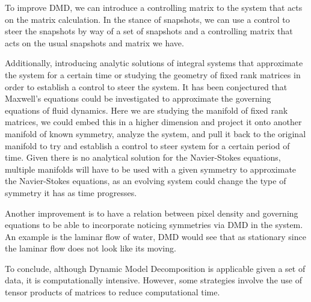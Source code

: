 \documentclass[12pt]{report}
\begin{document}
To improve DMD, we can introduce a controlling matrix to the system that acts on the matrix calculation. In the stance of snapshots, we can use a control to steer the snapshots by way of a set of snapshots and a controlling matrix that acts on the usual snapshots and matrix we have. 

Additionally, introducing analytic solutions of integral systems that approximate the system for a certain time or studying the geometry of fixed rank matrices in order to establish a control to steer the system. It has been conjectured that Maxwell's equations could be investigated to approximate the governing equations of fluid dynamics. Here we are studying the manifold of fixed rank matrices, we could embed this in a higher dimension and project it onto another manifold of known symmetry, analyze the system, and pull it back to the original manifold to try and establish a control to steer system for a certain period of time. Given there is no analytical solution for the Navier-Stokes equations, multiple manifolds will have to be used with a given symmetry to approximate the Navier-Stokes equations, as an evolving system could change the type of symmetry it has as time progresses. 

Another improvement is to have a relation between pixel density and governing equations to be able to incorporate noticing symmetries via DMD in the system. An example is the laminar flow of water, DMD would see that as stationary since the laminar flow does not look like its moving. 

To conclude, although Dynamic Model Decomposition is applicable given a set of data, it is computationally intensive. However, some strategies involve the use of tensor products of matrices to reduce computational time.
\end{document}
